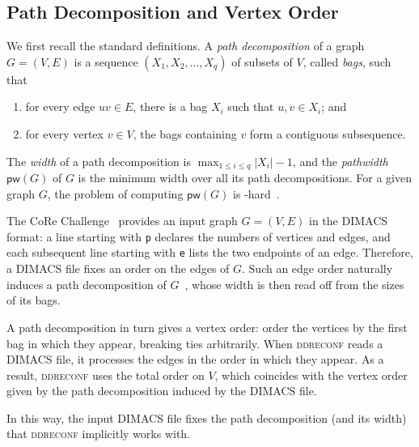 \documentclass[conference]{IEEEtran}
\newcommand{\zsol}{\mathcal{Z}_{\mathrm{sol}}}
\begin{document}
\subsection{Path Decomposition and Vertex Order}
\label{subsec:pathdecomp}
We first recall the standard definitions.
A \emph{path decomposition} of a graph $G = (V, E)$ is a sequence
$(X_1, X_2, \dots, X_q)$ of subsets of $V$, called \emph{bags}, such that
\begin{enumerate}
\item[(i)] for every edge $uv \in E$, there is a bag $X_i$ such that $u, v \in X_i$; and
\item[(ii)] for every vertex $v \in V$, the bags containing $v$ form a contiguous
subsequence.
\end{enumerate}
The \emph{width} of a path decomposition is
$\max_{1 \le i \le q} |X_i| - 1$, and the \emph{pathwidth} $\mathsf{pw}(G)$ of
$G$ is the minimum width over all its path decompositions.
For a given graph $G$, the problem of computing $\mathsf{pw}(G)$ is
\NP-hard~\cite{ACP97}.

The CoRe Challenge~\cite{sotaokit24} provides an input graph $G=(V,E)$ in the DIMACS
format: a line starting with \texttt{p} declares the numbers of vertices and
edges, and each subsequent line starting with \texttt{e} lists the two endpoints
of an edge. Therefore, a DIMACS file fixes an order on the edges of $G$.
Such an edge order naturally induces a path decomposition of
$G$~\cite[Lemma~2]{KobayashiNakahata2020}, whose width is then read off from the
sizes of its bags. 

A path decomposition in turn gives a vertex order: order the vertices by the
first bag in which they appear, breaking ties arbitrarily. 
When \textsc{ddreconf} reads a DIMACS file, it processes the edges in the order
in which they appear.
As a result, \textsc{ddreconf} uses the total order on $V$, which coincides with
the vertex order given by the path decomposition induced by the DIMACS file.

In this way, the input DIMACS file fixes the path decomposition (and its width)
that \textsc{ddreconf} implicitly works with.
\end{document}
